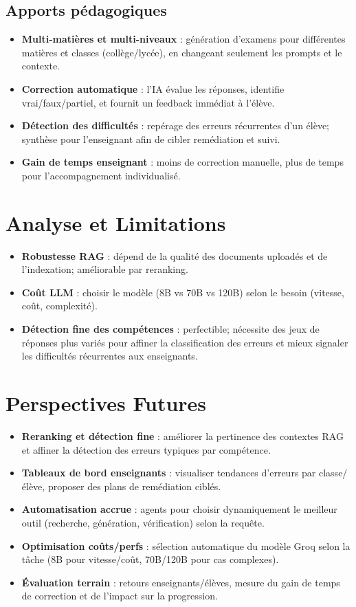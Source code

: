 \subsection{Apports pédagogiques}
\begin{itemize}
    \item \textbf{Multi-matières et multi-niveaux} : génération d’examens pour différentes matières et classes (collège/lycée), en changeant seulement les prompts et le contexte.
    \item \textbf{Correction automatique} : l’IA évalue les réponses, identifie vrai/faux/partiel, et fournit un feedback immédiat à l’élève.
    \item \textbf{Détection des difficultés} : repérage des erreurs récurrentes d’un élève; synthèse pour l’enseignant afin de cibler remédiation et suivi.
    \item \textbf{Gain de temps enseignant} : moins de correction manuelle, plus de temps pour l’accompagnement individualisé.
\end{itemize}

\section{Analyse et Limitations}
\begin{itemize}
    \item \textbf{Robustesse RAG} : dépend de la qualité des documents uploadés et de l’indexation; améliorable par reranking.
    \item \textbf{Coût LLM} : choisir le modèle (8B vs 70B vs 120B) selon le besoin (vitesse, coût, complexité).
    \item \textbf{Détection fine des compétences} : perfectible; nécessite des jeux de réponses plus variés pour affiner la classification des erreurs et mieux signaler les difficultés récurrentes aux enseignants.
\end{itemize}

\section{Perspectives Futures}
\begin{itemize}
    \item \textbf{Reranking et détection fine} : améliorer la pertinence des contextes RAG et affiner la détection des erreurs typiques par compétence.
    \item \textbf{Tableaux de bord enseignants} : visualiser tendances d’erreurs par classe/élève, proposer des plans de remédiation ciblés.
    \item \textbf{Automatisation accrue} : agents pour choisir dynamiquement le meilleur outil (recherche, génération, vérification) selon la requête.
    \item \textbf{Optimisation coûts/perfs} : sélection automatique du modèle Groq selon la tâche (8B pour vitesse/coût, 70B/120B pour cas complexes).
    \item \textbf{Évaluation terrain} : retours enseignants/élèves, mesure du gain de temps de correction et de l’impact sur la progression.
\end{itemize}

